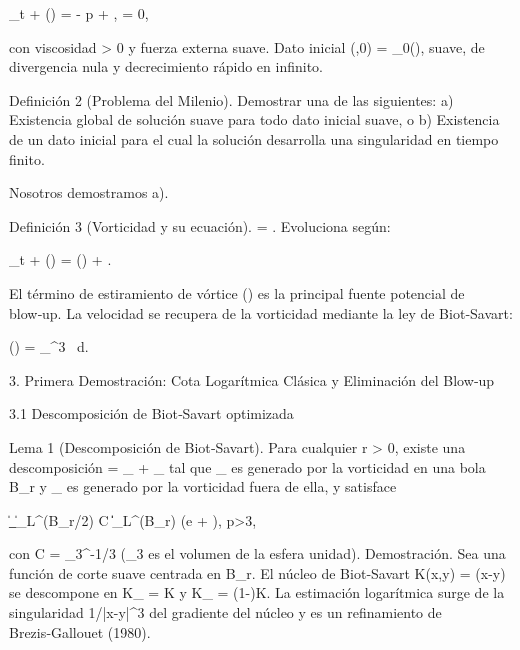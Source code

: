 \documentclass[12pt,a4paper]{book}
\begin{document}
\partial_t  + (\cdot\nabla) = \nu \Delta {} - \nabla p + , \qquad \nabla\cdot{} = 0,

con viscosidad \nu > 0 y fuerza externa  suave. Dato inicial (,0) = _0(), suave, de divergencia nula y decrecimiento rápido en infinito.

Definición 2 (Problema del Milenio). Demostrar una de las siguientes:
a) Existencia global de solución suave para todo dato inicial suave, o
b) Existencia de un dato inicial para el cual la solución desarrolla una singularidad en tiempo finito.

Nosotros demostramos a).

Definición 3 (Vorticidad y su ecuación). \boldsymbol{\omega} = \nabla\times{}. Evoluciona según:

\partial_t \boldsymbol{\omega} + (\cdot\nabla)\boldsymbol{\omega} = (\boldsymbol{\omega}\cdot\nabla) + \nu \Delta \boldsymbol{\omega}.

El término de estiramiento de vórtice (\boldsymbol{\omega}\cdot\nabla) es la principal fuente potencial de blow‑up. La velocidad se recupera de la vorticidad mediante la ley de Biot‑Savart:

() =  \int_{^3}  \, d.

3. Primera Demostración: Cota Logarítmica Clásica y Eliminación del Blow‑up

3.1 Descomposición de Biot‑Savart optimizada

Lema 1 (Descomposición de Biot‑Savart). Para cualquier r > 0, existe una descomposición  = _{} + _{} tal que _{} es generado por la vorticidad en una bola B_r y _{} es generado por la vorticidad fuera de ella, y satisface

\|\nabla {}_{}\|_{L^\infty(B_{r/2})} \le C \|\boldsymbol{\omega}\|_{L^\infty(B_r)} \log\left(e + \right), \quad p>3,

con C = \omega_3^{-1/3} (\omega_3 es el volumen de la esfera unidad). Demostración. Sea \chi una función de corte suave centrada en B_r. El núcleo de Biot‑Savart K(x,y) = \nabla\Phi(x-y) se descompone en K_{} = \chi K y K_{} = (1-\chi)K. La estimación logarítmica surge de la singularidad 1/|x-y|^3 del gradiente del núcleo y es un refinamiento de Brezis‑Gallouet (1980).
\end{document}

